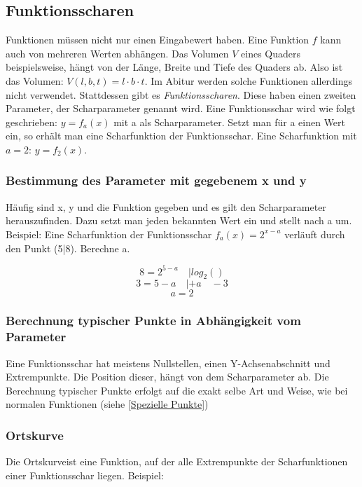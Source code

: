 \documentclass{article}
\begin{document}
\subsection{Funktionsscharen}

Funktionen müssen nicht nur einen Eingabewert haben. Eine Funktion $f$ kann auch von mehreren Werten abhängen.
Das Volumen $V$ eines Quaders beispielsweise, hängt von der Länge, Breite und Tiefe des Quaders ab.
Also ist das Volumen: $V(l,b,t)=l \cdot b \cdot t$. Im Abitur werden solche Funktionen allerdings nicht verwendet.
Stattdessen gibt es \emph{Funktionsscharen}. Diese haben einen zweiten Parameter, der Scharparameter genannt wird.
Eine Funktionsschar wird wie folgt geschrieben: $y=f_a(x)$ mit a als Scharparameter. Setzt man für a einen Wert ein,
so erhält man eine Scharfunktion der Funktionsschar. Eine Scharfunktion mit $a=2$: $y=f_2(x)$.

\subsubsection{Bestimmung des Parameter mit gegebenem x und y}
Häufig sind x, y und die Funktion gegeben und es gilt den Scharparameter herauszufinden. Dazu setzt man jeden bekannten
Wert ein und stellt nach a um. Beispiel: Eine Scharfunktion der Funktionsschar $f_a(x)=2^{x-a}$
verläuft durch den Punkt (5|8). Berechne a.

\[ 8=2^{5-a} \quad | log_2() \]
\[ 3=5-a \quad | +a \quad -3 \]
\[ a=2 \]

\subsubsection{Berechnung typischer Punkte in Abhängigkeit vom Parameter}
Eine Funktionsschar hat meistens Nullstellen, einen Y-Achsenabschnitt und Extrempunkte. Die Position dieser,
hängt von dem Scharparameter ab. Die Berechnung typischer Punkte erfolgt auf die exakt selbe Art und Weise,
wie bei normalen Funktionen (siehe \ref{Spezielle Punkte})

\subsubsection{Ortskurve}

Die Ortskurveist eine Funktion, auf der alle Extrempunkte der Scharfunktionen einer Funktionsschar liegen. Beispiel:
\end{document}
